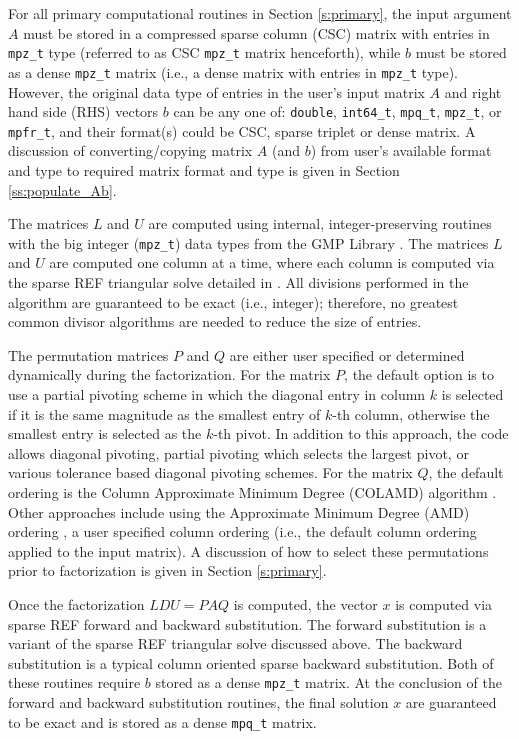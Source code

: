 \documentclass[12pt]{article}
\theoremstyle{definition}
\begin{document}
For all primary computational routines in Section \ref{s:primary}, the input
argument $A$ must be stored in a compressed sparse column (CSC) matrix with
entries in \verb|mpz_t| type (referred to as CSC \verb|mpz_t| matrix
henceforth), while $b$ must be stored as a dense \verb|mpz_t| matrix (i.e., a
dense matrix with entries in \verb|mpz_t| type).  However, the original data
type of entries in the user's input matrix $A$ and right hand side (RHS)
vectors $b$ can be any one of: \verb|double|, \verb|int64_t|, \verb|mpq_t|,
\verb|mpz_t|, or \verb|mpfr_t|, and their format(s) could be CSC, sparse
triplet or dense matrix.  A discussion of converting/copying matrix $A$ (and
$b$) from user's available format and type to required matrix format and type
is given in Section \ref{ss:populate_Ab}.

The matrices $L$ and $U$ are computed using internal, integer-preserving
routines with the big integer (\verb|mpz_t|) data types from the GMP Library
\cite{granlund2015gnu}. The matrices $L$ and $U$ are computed one column at a
time, where each column is computed via the sparse REF triangular solve
detailed in \cite{lourenco2019exact}. All divisions performed in the algorithm
are guaranteed to be exact (i.e., integer); therefore, no greatest common
divisor algorithms are needed to reduce the size of entries.

The permutation matrices $P$ and $Q$ are either user specified or determined
dynamically during the factorization. For the matrix $P$, the default option is
to use a partial pivoting scheme in which the diagonal entry in column $k$ is
selected if it is the same magnitude as the smallest entry of $k$-th column,
otherwise the smallest entry is selected as the $k$-th pivot. In addition to
this approach, the code allows diagonal pivoting, partial pivoting which
selects the largest pivot, or various tolerance based diagonal pivoting
schemes. For the matrix $Q$, the default ordering is the Column Approximate
Minimum Degree (COLAMD) algorithm
\cite{davis2004algorithmcolamd,davis2004column}. Other approaches include using
the Approximate Minimum Degree (AMD) ordering
\cite{amestoy1996approximate,amestoy2004algorithmamd}, a user specified column
ordering (i.e., the default column ordering applied to the input matrix). A
discussion of how to select these permutations prior to factorization is given
in Section \ref{s:primary}.

Once the factorization $L D U = P A Q $ is computed, the vector $x$ is
computed via sparse REF forward and backward substitution. The forward
substitution is a variant of the sparse REF triangular solve discussed above.
The backward substitution is a typical column oriented sparse backward
substitution. Both of these routines require $b$ stored as a dense
\verb|mpz_t| matrix. At the conclusion of the forward and backward
substitution routines, the final solution $x$ are guaranteed
to be exact and is stored as a dense \verb|mpq_t| matrix.
\end{document}
